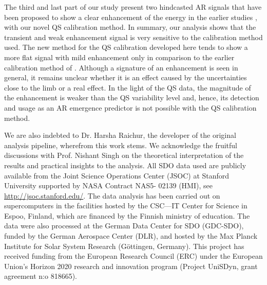 \documentclass{aa}
\begin{document}
The third and last part of our study present two hindcasted 
AR \fff signals that have been proposed to show a clear enhancement of the \fff energy in the earlier studies \citep[][]{SRB16,Waidele22}, with our novel QS calibration method. In summary, our analysis shows that the transient
and weak enhancement signal is very sensitive to the calibration
method used. The new method for the QS calibration developed here tends to show a more flat signal with mild enhancement only in comparison to the earlier calibration method of \cite{SRB16}. Although a signature of an enhancement is seen in general, it remains unclear whether it is an effect caused by the uncertainties close to the limb or a real effect. In the light of the QS data, the magnitude of the enhancement is weaker than the QS variability level and, hence, its detection and usage as an AR emergence predictor is not possible with the QS calibration method.

\begin{acknowledgements}
We are also indebted to Dr. Harsha Raichur, the developer of the original \fff analysis pipeline, wherefrom this work stems. We acknowledge the fruitful discussions with Prof. Nishant Singh on the theoretical interpretation of the results and practical insights to the analysis.
All SDO data used are publicly available from the Joint Science Operations Center (JSOC) at Stanford University supported by NASA Contract NAS5- 02139 (HMI), see \url{http://jsoc.stanford.edu/}. 
The data analysis has been carried out on supercomputers in the facilities hosted by the CSC---IT
Center for Science in Espoo, Finland, which are financed by the
Finnish ministry of education.
The data were also
processed at the German Data Center for SDO (GDC-SDO), funded by the
German Aerospace Center (DLR), and hosted by the Max Planck Institute for Solar System Research (Göttingen, Germany).
This project has received funding from the European Research Council (ERC)
under the European Union's Horizon 2020 research and innovation
program (Project UniSDyn, grant agreement n:o 818665).

\end{acknowledgements}

{}

\end{document}
